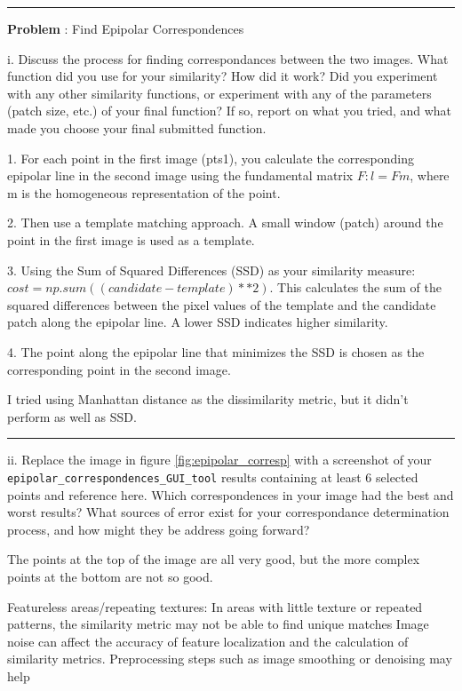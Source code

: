 \documentclass[onecolumn,10pt]{article}
\begin{document}
\hrule
\addtocounter{problemnumber}{1}
\noindent\textbf{Problem }:  Find Epipolar Correspondences

i. Discuss the process for finding correspondances between the two images. What function did you use for your similarity? How did it work? Did you experiment with any other similarity functions, or experiment with any of the parameters (patch size, etc.) of your final function? If so, report on what you tried, and what made you choose your final submitted function.

1. For each point in the first image (pts1), you calculate the corresponding epipolar line in the second image using the fundamental matrix $F: l = F m$, where m is the homogeneous representation of the point.

2. Then use a template matching approach.  A small window (patch) around the point in the first image is used as a template.

3. Using the Sum of Squared Differences (SSD) as your similarity measure: $cost = np.sum((candidate - template) ** 2)$.  This calculates the sum of the squared differences between the pixel values of the template and the candidate patch along the epipolar line. A lower SSD indicates higher similarity.

4. The point along the epipolar line that minimizes the SSD is chosen as the corresponding point in the second image.


I tried using Manhattan distance as the dissimilarity metric, but it didn’t perform as well as SSD.
\hrule
ii. Replace the image in figure \ref{fig:epipolar_corresp} with a screenshot of your {\tt epipolar\_correspondences\_GUI\_tool} results containing at least 6 selected points and reference here. Which correspondences in your image had the best and worst results? What sources of error exist for your correspondance determination process, and how might they be address going forward?

The points at the top of the image are all very good, but the more complex points at the bottom are not so good.

Featureless areas/repeating textures: In areas with little texture or repeated patterns, the similarity metric may not be able to find unique matches
Image noise can affect the accuracy of feature localization and the calculation of similarity metrics. Preprocessing steps such as image smoothing or denoising may help
\end{document}
